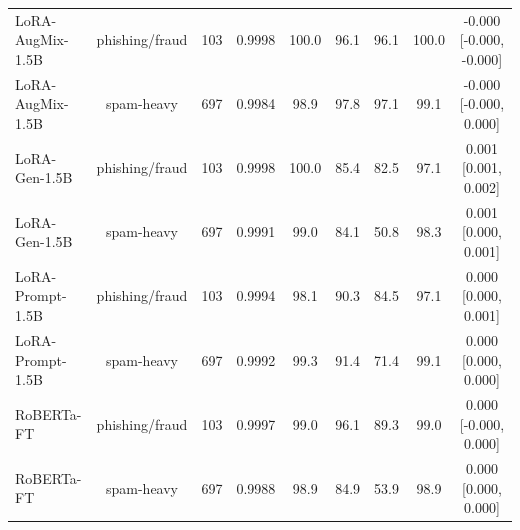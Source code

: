 \begin{table}[t]
\begin{tabular}{lcccccccc}
LoRA-AugMix-1.5B & phishing/fraud & 103 & 0.9998 & 100.0 & 96.1 & 96.1 & 100.0 & -0.000 [-0.000, -0.000] \\
LoRA-AugMix-1.5B & spam-heavy & 697 & 0.9984 & 98.9 & 97.8 & 97.1 & 99.1 & -0.000 [-0.000, 0.000] \\
LoRA-Gen-1.5B & phishing/fraud & 103 & 0.9998 & 100.0 & 85.4 & 82.5 & 97.1 & 0.001 [0.001, 0.002] \\
LoRA-Gen-1.5B & spam-heavy & 697 & 0.9991 & 99.0 & 84.1 & 50.8 & 98.3 & 0.001 [0.000, 0.001] \\
LoRA-Prompt-1.5B & phishing/fraud & 103 & 0.9994 & 98.1 & 90.3 & 84.5 & 97.1 & 0.000 [0.000, 0.001] \\
LoRA-Prompt-1.5B & spam-heavy & 697 & 0.9992 & 99.3 & 91.4 & 71.4 & 99.1 & 0.000 [0.000, 0.000] \\
RoBERTa-FT & phishing/fraud & 103 & 0.9997 & 99.0 & 96.1 & 89.3 & 99.0 & 0.000 [-0.000, 0.000] \\
RoBERTa-FT & spam-heavy & 697 & 0.9988 & 98.9 & 84.9 & 53.9 & 98.9 & 0.000 [0.000, 0.000] \\
\bottomrule
\end{tabular}
\end{table}
